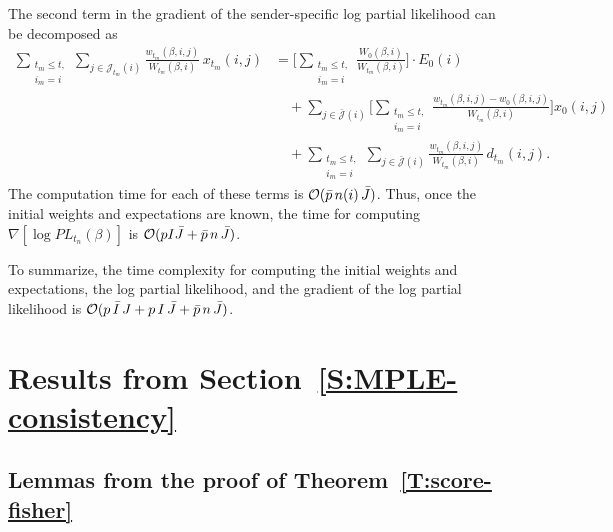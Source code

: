 \documentclass[final]{statsoc}
\begin{document}
The second term in the gradient of the sender-specific log partial likelihood
can be decomposed as
\begin{align*}
    \sum_{\substack{t_m \leq t, \\ i_m = i}}
    \sum_{j \in \mathcal{J}_{t_m}\!(i)}\!\!
        \frac{w_{t_m}\!(\beta,i,j)}{W_{t_m}\!(\beta,i)}
        \,
        x_{t_m}\!(i,j)
    &=
        \bigg[
        \sum_{\substack{t_m \leq t, \\ i_m = i}}
            \frac{
                W_{0}(\beta,i)
            }{
                W_{t_m}\!(\beta,i)
            }
        \bigg]
        \cdot
        E_0(i) \\
    &\quad+
        \sum_{j \in \mathcal{\bar J}(i)}
            \bigg[
                \sum_{\substack{t_m \leq t, \\ i_m = i}}
                    \frac{
                        w_{t_m}\!(\beta,i,j)
                        -
                        w_{0}(\beta,i,j)
                    }{
                        W_{t_m}\!(\beta,i)
                    }
            \bigg]
            x_0(i,j) \\
    &\quad+
        \sum_{\substack{t_m \leq t, \\ i_m = i}}
            \sum_{j \in \mathcal{\bar J}(i)}
                \frac{w_{t_m}\!(\beta,i,j)}{W_{t_m}\!(\beta,i)}
                \,
                d_{t_m}\!(i,j).
\end{align*}
The computation time for each of these terms is
$\mathcal{O}(\bar p \, n(i) \, \bar J)$.  Thus, once the initial weights and
expectations are known, the time for computing
$\nabla [ \log \mathit{PL}_{t_n}\!(\beta) ]$ is
$\mathcal{O}(p I \bar J + \bar p \, n \, \bar J)$.

To summarize, the time complexity for computing the initial weights and
expectations, the log partial likelihood, and the gradient of the log partial
likelihood is
$\mathcal{O}(p \, \bar I \, J + p \, I \, \bar J + \bar p \, n \, \bar J)$.


\newcommand{\MPLEconsistencysection}{\ref{S:MPLE-consistency}}
\section{Results from Section~\protect\MPLEconsistencysection{}}
\label{S:MPLE-consistency-proofs}

\subsection{Lemmas from the proof of Theorem~\ref{T:score-fisher}}
\end{document}
